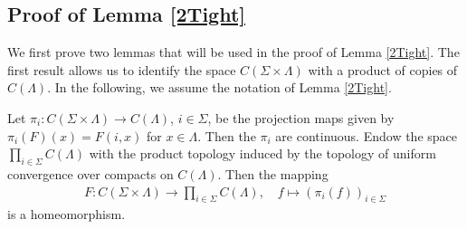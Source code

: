 \subsection{Proof of Lemma \ref{2Tight}}

We first prove two lemmas that will be used in the proof of Lemma \ref{2Tight}. The first result allows us to identify the space $C(\Sigma\times\Lambda)$ with a product of copies of $C(\Lambda)$. In the following, we assume the notation of Lemma \ref{2Tight}.

\begin{lemma}\label{ProdTop}
	Let $\pi_i: C (\Sigma \times \Lambda) \rightarrow C(\Lambda)$, $i \in \Sigma$, be the projection maps given by
	$\pi_i(F)(x) = F(i, x)$ for $x \in \Lambda$. Then the $\pi_i$ are continuous. Endow the space $\prod_{i\in\Sigma} C(\Lambda)$ with the product topology induced by the topology of uniform convergence over compacts on $C(\Lambda)$. Then the mapping
	\begin{align*}
		F : C(\Sigma\times\Lambda) \longrightarrow \prod_{i\in\Sigma} C(\Lambda), \quad f\mapsto (\pi_i(f))_{i\in\Sigma}
	\end{align*}
	is a homeomorphism.
\end{lemma}

